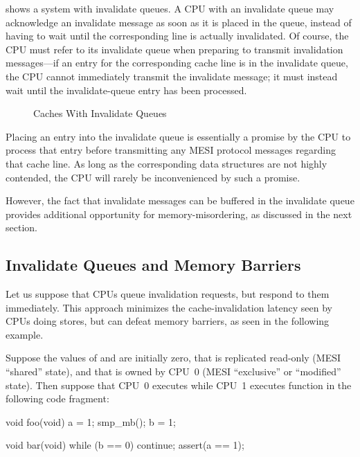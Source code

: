 shows a system with invalidate queues.
A CPU with an invalidate queue may acknowledge an invalidate message
as soon as it is placed in the queue, instead of having to wait until
the corresponding line is actually invalidated.
Of course, the CPU must refer to its invalidate queue when preparing
to transmit invalidation messages---if an entry for the corresponding
cache line is in the invalidate queue, the CPU cannot immediately
transmit the invalidate message; it must instead wait until the
invalidate-queue entry has been processed.

\begin{figure}[htb]
\centering
{}
\caption{Caches With Invalidate Queues}
\label{fig:app:whymb:Caches With Invalidate Queues}
\end{figure}

Placing an entry into the invalidate queue is essentially a promise
by the CPU to process that entry before transmitting any MESI protocol
messages regarding that cache line.
As long as the corresponding data structures are not highly contended,
the CPU will rarely be inconvenienced by such a promise.

However, the fact that invalidate messages can be buffered in the
invalidate queue provides additional opportunity for memory-misordering,
as discussed in the next section.

\subsection{Invalidate Queues and Memory Barriers}
\label{sec:app:whymb:Invalidate Queues and Memory Barriers}

Let us suppose that CPUs queue invalidation requests, but respond to
them immediately.
This approach minimizes the cache-invalidation latency seen by CPUs
doing stores, but can defeat memory barriers, as seen in the following
example.

Suppose the values of  and  are initially zero,
that  is replicated read-only (MESI ``shared'' state),
and that 
is owned by CPU~0 (MESI ``exclusive'' or ``modified'' state).
Then suppose that CPU~0 executes  while CPU~1 executes
function  in the following code fragment:

\begin{fcvlabel}
\begin{VerbatimN}[fontsize=\footnotesize,samepage=true,commandchars=\\\[\]]
void foo(void)
{
	a = 1;
	smp_mb();	\lnlbl[mb]
	b = 1;
}

void bar(void)
{
	while (b == 0) continue;
	assert(a == 1);
}
\end{VerbatimN}
\end{fcvlabel}

